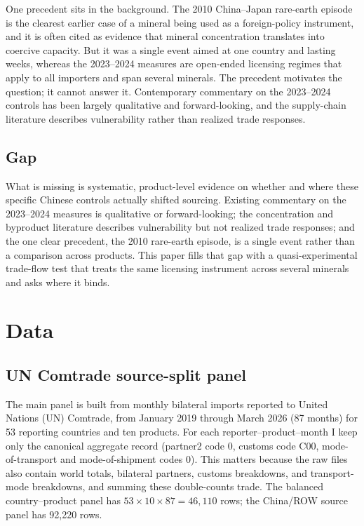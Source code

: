 \documentclass[12pt,a4paper]{article}
\begin{document}
One precedent sits in the background. The 2010 China--Japan rare-earth episode is
the clearest earlier case of a mineral being used as a foreign-policy instrument,
and it is often cited as evidence that mineral concentration translates into
coercive capacity. But it was a single event aimed at one country and lasting
weeks, whereas the 2023--2024 measures are open-ended licensing regimes that
apply to all importers and span several minerals. The precedent motivates the
question; it cannot answer it. Contemporary commentary on the 2023--2024
controls has been largely qualitative and forward-looking, and the supply-chain
literature describes vulnerability rather than realized trade responses.

\subsection{Gap}

What is missing is systematic, product-level evidence on whether and where these
specific Chinese controls actually shifted sourcing. Existing commentary on the
2023--2024 measures is qualitative or forward-looking; the concentration and
byproduct literature describes vulnerability but not realized trade responses;
and the one clear precedent, the 2010 rare-earth episode, is a single event
rather than a comparison across products. This paper fills that gap with a
quasi-experimental trade-flow test that treats the same licensing instrument
across several minerals and asks where it binds.

\section{Data}\label{sec:data}

\subsection{UN Comtrade source-split panel}\label{sec:comtrade}

The main panel is built from monthly bilateral imports reported to United
Nations (UN) Comtrade, from January 2019 through March 2026 (87 months) for 53
reporting countries and ten products. For each reporter--product--month I keep
only the canonical aggregate record (partner2 code 0, customs code C00,
mode-of-transport and mode-of-shipment codes 0). This matters because the raw
files also contain world totals, bilateral partners, customs breakdowns, and
transport-mode breakdowns, and summing these double-counts trade. The balanced
country--product panel has $53\times10\times87=46{,}110$ rows; the
China/ROW source panel has 92,220 rows.
\end{document}
